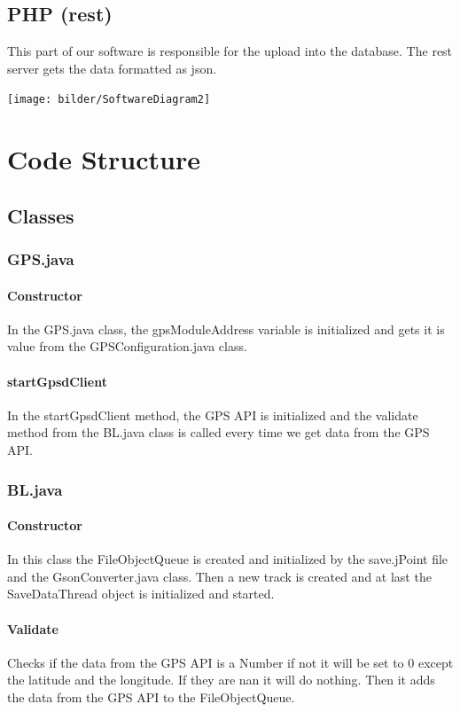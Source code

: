 \subsection{PHP (\gls{rest})}
This part of our software is responsible for the upload into the database. The \gls{rest} server gets the data formatted as \gls{json}.
\begin{center}
\texttt{[image: bilder/SoftwareDiagram2]}
\end{center} 
\section{Code Structure}
\subsection{Classes}
\subsubsection{GPS.java}
\paragraph{Constructor}
In the GPS.java class, the gpsModuleAddress variable is initialized and gets it is value from the GPSConfiguration.java class.
\paragraph{startGpsdClient}
In the startGpsdClient method, the GPS API is initialized and the validate method from the BL.java class is called every time we get data from the GPS API.
\subsubsection{BL.java}
\paragraph{Constructor}
In this class the FileObjectQueue is created and initialized by the save.jPoint file and the GsonConverter.java class. 
Then a new track is created and at last the SaveDataThread object is initialized and started.
\paragraph{Validate}
Checks if the data from the GPS API is a Number if not it will be set to 0 except the latitude and the longitude. If they are \gls{nan} it will do nothing. 
Then it adds the data from the GPS API to the FileObjectQueue.
